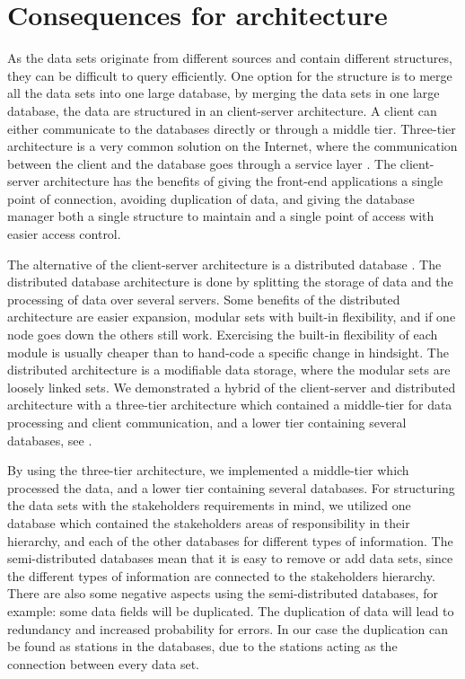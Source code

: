 

\section{Consequences for architecture} %
\label{sec:consequences_for_architecture}
As the data sets originate from different sources and contain different
structures, they can be difficult to query efficiently. One option for the structure is to merge all the
data sets into one large database, by merging the data sets in one large
database, the data are structured in an client-server architecture. 
A client can either communicate to the databases directly or through a middle
tier. Three-tier architecture is a very common solution on the Internet, where 
the communication between the client and the database goes through a service 
layer \cite[pp. 294-297]{toftHanseMallaugDatabaser}. The client-server 
architecture has the benefits of giving the front-end applications a single 
point of connection, avoiding duplication of data, and giving the database 
manager both a single structure to maintain and a single point of access with 
easier access control.

The alternative of the client-server architecture is a distributed
database \cite[pp. 301-303]{toftHanseMallaugDatabaser}. The distributed database
architecture is done by splitting the storage of data and the processing of
data over several servers. Some benefits of the distributed architecture are 
easier expansion, modular sets with built-in flexibility, and if one node 
goes down the others still work. Exercising the built-in flexibility of each
module is usually cheaper than to hand-code a specific change in hindsight\cite[pp. 117-130]{Bass:2012:SAP:2392670}. The distributed architecture is a 
modifiable data storage, where the modular sets are loosely linked sets. 
We demonstrated a hybrid of the client-server and distributed
architecture \cite[pp. 297-299]{toftHanseMallaugDatabaser} with a three-tier
architecture which contained a middle-tier for data processing and client
communication, and a lower tier containing several databases, see
.

By using the three-tier architecture, we implemented a middle-tier which 
processed the data, and a lower tier containing several databases. For
structuring the data sets with the stakeholders requirements in mind, we
utilized one database which contained the stakeholders areas of responsibility in
their hierarchy, and each of the other databases for different types of 
information. The semi-distributed databases mean that it is easy to remove or
add data sets, since the different types of information are connected to the
stakeholders hierarchy. There are also some negative aspects using
the semi-distributed databases, for example: some data fields
will be duplicated. The duplication of data will lead to redundancy and
increased probability for errors. In our case the duplication can be found as stations in the databases, due to the stations acting as the
connection between every data set. 


